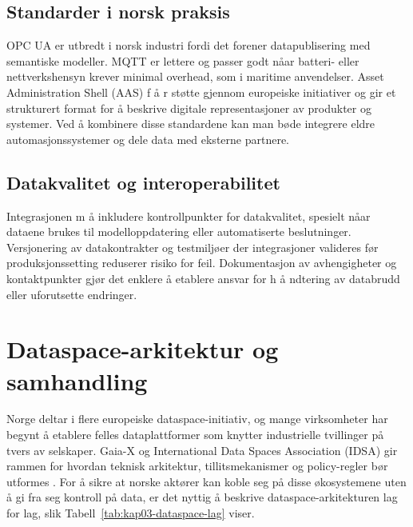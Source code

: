 \subsection{Standarder i norsk praksis}
OPC UA er utbredt i norsk industri fordi det forener datapublisering med semantiske modeller. MQTT er lettere og passer godt nåar batteri- eller nettverkshensyn krever minimal overhead, som i maritime anvendelser. Asset Administration Shell (AAS) f å r støtte gjennom europeiske initiativer og gir et strukturert format for  å beskrive digitale representasjoner av produkter og systemer. Ved  å kombinere disse standardene kan man bøde integrere eldre automasjonssystemer og dele data med eksterne partnere.

\subsection{Datakvalitet og interoperabilitet}
Integrasjonen m å inkludere kontrollpunkter for datakvalitet, spesielt nåar dataene brukes til modelloppdatering eller automatiserte beslutninger. Versjonering av datakontrakter og testmiljøer der integrasjoner valideres før produksjonssetting reduserer risiko for feil. Dokumentasjon av avhengigheter og kontaktpunkter gjør det enklere  å etablere ansvar for h å ndtering av databrudd eller uforutsette endringer.

\section{Dataspace-arkitektur og samhandling}
Norge deltar i flere europeiske dataspace-initiativ, og mange virksomheter har begynt å etablere felles dataplattformer som
knytter industrielle tvillinger på tvers av selskaper. Gaia-X og International Data Spaces Association (IDSA) gir rammen for
hvordan teknisk arkitektur, tillitsmekanismer og policy-regler bør utformes \citep{gaiax2023architecture,idsa2023ram}. For å
sikre at norske aktører kan koble seg på disse økosystemene uten å gi fra seg kontroll på data, er det nyttig å beskrive
dataspace-arkitekturen lag for lag, slik Tabell~\ref{tab:kap03-dataspace-lag} viser.

